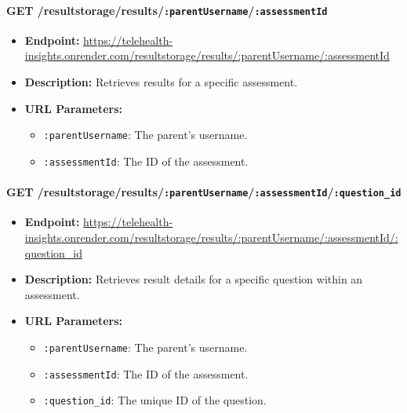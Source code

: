 \documentclass{article}
\begin{document}
  \paragraph{GET /resultstorage/results/\texttt{:parentUsername}/\texttt{:assessmentId}}
  \begin{itemize}
      \item \textbf{Endpoint:} 
          \url{https://telehealth-insights.onrender.com/resultstorage/results/:parentUsername/:assessmentId}
      \item \textbf{Description:} Retrieves results for a specific assessment.
      \item \textbf{URL Parameters:}
      \begin{itemize}
          \item \texttt{:parentUsername}: The parent’s username.
          \item \texttt{:assessmentId}: The ID of the assessment.
      \end{itemize}
  \end{itemize}
  
  \paragraph{GET /resultstorage/results/\texttt{:parentUsername}/\texttt{:assessmentId}/\texttt{:question\_id}}
  \begin{itemize}
      \item \textbf{Endpoint:} 
          \url{https://telehealth-insights.onrender.com/resultstorage/results/:parentUsername/:assessmentId/:question_id}
      \item \textbf{Description:} Retrieves result details for a specific 
            question within an assessment.
      \item \textbf{URL Parameters:}
      \begin{itemize}
          \item \texttt{:parentUsername}: The parent’s username.
          \item \texttt{:assessmentId}: The ID of the assessment.
          \item \texttt{:question\_id}: The unique ID of the question.
      \end{itemize}
  \end{itemize}
  
\end{document}
